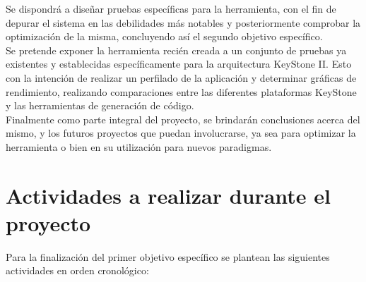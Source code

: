 Se dispondrá a diseñar pruebas específicas para la herramienta, con el fin de 
depurar el sistema en las debilidades más notables y posteriormente comprobar la optimización de la
misma, concluyendo así el segundo objetivo específico.\\

Se pretende exponer la herramienta recién creada a un conjunto de pruebas
ya existentes y establecidas específicamente para la arquitectura KeyStone II. 
Esto con la intención de realizar un perfilado de la aplicación y determinar gráficas de rendimiento, 
realizando comparaciones entre las diferentes plataformas KeyStone y las
herramientas de generación de código.\\

Finalmente como parte integral del proyecto, se brindarán conclusiones acerca
del mismo, y los futuros proyectos que puedan involucrarse, ya sea para
optimizar la herramienta o bien en su utilización para nuevos paradigmas.

\section{Actividades a realizar durante el proyecto}

Para la finalización del primer objetivo específico se plantean las siguientes actividades
en orden cronológico:

